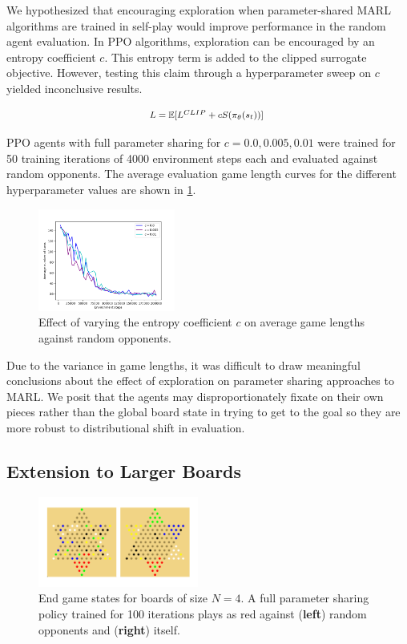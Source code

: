 \documentclass[12pt, a4paper, twocolumn]{article}
\begin{document}
We hypothesized that encouraging exploration when parameter-shared MARL algorithms are trained in self-play would improve performance in the random agent evaluation. In PPO algorithms, exploration can be encouraged by an entropy coefficient $c$. This entropy term is added to the clipped surrogate objective. However, testing this claim through a hyperparameter sweep on $c$ yielded inconclusive results.

$$
  \mbox{\footnotesize
  $L = \mathbb{E}[L^{CLIP} + cS(\pi_{\theta}(s_t))]$
  }
$$

PPO agents with full parameter sharing for $c = 0.0, 0.005, 0.01$ were trained for 50 training iterations of 4000 environment steps each and evaluated against random opponents. The average evaluation game length curves for the different hyperparameter values are shown in \ref{fig:exploration}.

\begin{figure}[h]
\centering
    \includegraphics[width=0.4\textwidth]{images/exploration.png}
  \caption{Effect of varying the entropy coefficient $c$ on average game lengths against random opponents.}\label{fig:exploration}
\end{figure}

Due to the variance in game lengths, it was difficult to draw meaningful conclusions about the effect of exploration on parameter sharing approaches to MARL. We posit that the agents may disproportionately fixate on their own pieces rather than the global board state in trying to get to the goal so they are more robust to distributional shift in evaluation.

\subsection{Extension to Larger Boards}

\begin{figure}[h]
  \centering
    \includegraphics[width=0.47\textwidth]{images/larger_boards.png}
  \caption{End game states for boards of size $N = 4$. A full parameter sharing policy trained for 100 iterations plays as red against (\textbf{left}) random opponents and (\textbf{right}) itself.}\label{fig:largerboards}
\end{figure}
\end{document}
